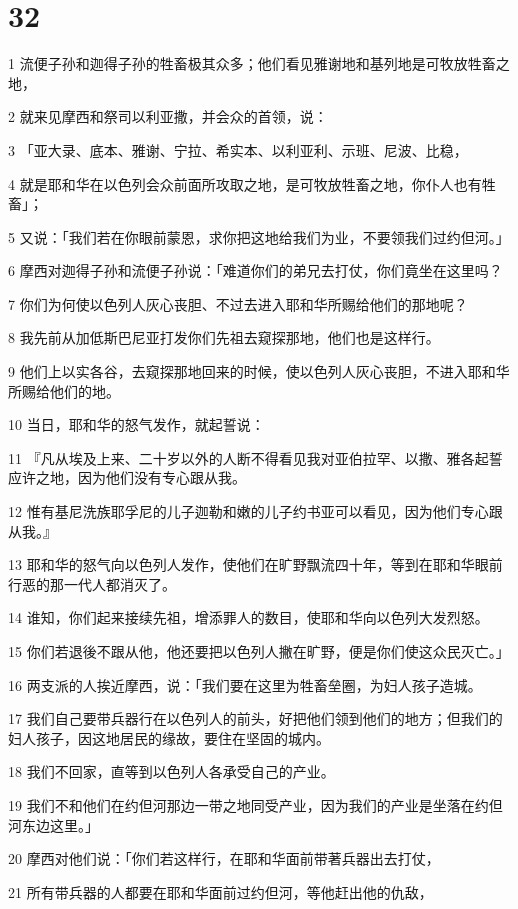 \chapter{32}

\par 1 流便子孙和迦得子孙的牲畜极其众多；他们看见雅谢地和基列地是可牧放牲畜之地，
\par 2 就来见摩西和祭司以利亚撒，并会众的首领，说：
\par 3 「亚大录、底本、雅谢、宁拉、希实本、以利亚利、示班、尼波、比稳，
\par 4 就是耶和华在以色列会众前面所攻取之地，是可牧放牲畜之地，你仆人也有牲畜」；
\par 5 又说：「我们若在你眼前蒙恩，求你把这地给我们为业，不要领我们过约但河。」
\par 6 摩西对迦得子孙和流便子孙说：「难道你们的弟兄去打仗，你们竟坐在这里吗？
\par 7 你们为何使以色列人灰心丧胆、不过去进入耶和华所赐给他们的那地呢？
\par 8 我先前从加低斯巴尼亚打发你们先祖去窥探那地，他们也是这样行。
\par 9 他们上以实各谷，去窥探那地回来的时候，使以色列人灰心丧胆，不进入耶和华所赐给他们的地。
\par 10 当日，耶和华的怒气发作，就起誓说：
\par 11 『凡从埃及上来、二十岁以外的人断不得看见我对亚伯拉罕、以撒、雅各起誓应许之地，因为他们没有专心跟从我。
\par 12 惟有基尼洗族耶孚尼的儿子迦勒和嫩的儿子约书亚可以看见，因为他们专心跟从我。』
\par 13 耶和华的怒气向以色列人发作，使他们在旷野飘流四十年，等到在耶和华眼前行恶的那一代人都消灭了。
\par 14 谁知，你们起来接续先祖，增添罪人的数目，使耶和华向以色列大发烈怒。
\par 15 你们若退後不跟从他，他还要把以色列人撇在旷野，便是你们使这众民灭亡。」
\par 16 两支派的人挨近摩西，说：「我们要在这里为牲畜垒圈，为妇人孩子造城。
\par 17 我们自己要带兵器行在以色列人的前头，好把他们领到他们的地方；但我们的妇人孩子，因这地居民的缘故，要住在坚固的城内。
\par 18 我们不回家，直等到以色列人各承受自己的产业。
\par 19 我们不和他们在约但河那边一带之地同受产业，因为我们的产业是坐落在约但河东边这里。」
\par 20 摩西对他们说：「你们若这样行，在耶和华面前带著兵器出去打仗，
\par 21 所有带兵器的人都要在耶和华面前过约但河，等他赶出他的仇敌，
